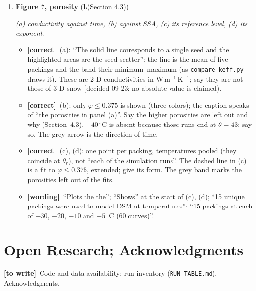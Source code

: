 \documentclass[11pt]{article}
\newcommand{\Miss}{\textcolor{miss}{\textbf{[to write]}}\ }
\newcommand{\Pg}[3]{\item \textbf{#1} {\small(#2)}\par\textit{#3}}
\newcommand{\tC}{\textcolor{miss}{\textbf{[correct]}}\ }
\newcommand{\tG}{\textcolor{stale}{\textbf{[wording]}}\ }
\newcommand{\tA}{\textcolor{have}{\textbf{[add]}}\ }
\begin{document}
\begin{enumerate}
\begin{itemize}
    is normalized at $\theta_r$, which falls at a different time at each
    temperature.
  \item \tA (c), (d): the five curves overlie (within 0.3\%); that is the
    result, and the caption can say it. Axes start at $\theta = 1$
    (log scale).
  \item \tG ``preformed'' (performed); ``2.0mm'' (2.0~mm); ``The vertical
    axis is $k_{\mathrm{eff}}$, average value of $k_{xx}$ and $k_{yy}$, is
    normalized'': ``$k_{\mathrm{eff}} = (k_{xx}+k_{yy})/2$, normalized
    \ldots''. ``Shows the same curves plotted for'': ``(c) The same curves
    against''.
  \end{itemize}
\Pg{Figure 7, porosity}{L(Section 4.3)}{(a) conductivity against time, (b) against SSA, (c) its reference level, (d) its exponent.}
  \begin{itemize}
  \item \tC (a): ``The solid line corresponds to a single seed and the
    highlighted areas are the seed scatter'': the line is the mean of five
    packings and the band their minimum--maximum (as
    \texttt{compare\_keff.py} draws it).
    These are 2-D conductivities in W\,m$^{-1}$\,K$^{-1}$; say they are not
    those of 3-D snow (decided 09-23: no absolute value is claimed).
  \item \tC (b): only $\varphi \le 0.375$ is shown (three colors); the
    caption speaks of ``the porosities in panel (a)''. Say the higher
    porosities are left out and why (Section~4.3). $-40\,^{\circ}$C is
    absent because those runs end at $\theta = 43$; say so. The grey arrow
    is the direction of time.
  \item \tC (c), (d): one point per packing, temperatures pooled (they
    coincide at $\theta_r$), not ``each of the simulation runs''. The dashed
    line in (c) is a fit to $\varphi \le 0.375$, extended; give its form.
    The grey band marks the porosities left out of the fits.
  \item \tG ``Plots the the''; ``Shows'' at the start of (c), (d); ``15
    unique packings were used to model DSM at temperatures'': ``15 packings
    at each of $-30$, $-20$, $-10$ and $-5\,^{\circ}$C (60 curves)''.
  \end{itemize}
\end{enumerate}

\section*{Open Research; Acknowledgments}
\Miss Code and data availability; run inventory (\texttt{RUN\_TABLE.md}).
Acknowledgments.
\end{document}
